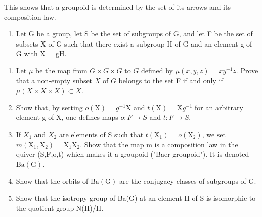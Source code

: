 This shows that a groupoid is determined by the set of its arrows and its composition law.

\begin{enumerate}
\def\labelenumi{\arabic{enumi})}
\setcounter{enumi}{11}
\tightlist
\item
  Let G be a group, let S be the set of subgroups of G, and let F be the set of subsets X of G such that there exist a subgroup H of G and an element g of G with X = gH.
\end{enumerate}

\begin{enumerate}
\def\labelenumi{\alph{enumi})}
\item
  Let \(\mu\) be the map from \(G \times G \times G\) to \(G\) defined by \(\mu(x,y,z)=xy^{-1}z\). Prove that a non-empty subset \(X\) of \(G\) belongs to the set F if and only if \(\mu(X\times X\times X)\subset X\).
\item
  Show that, by setting \(o(\mathrm{X}) = g^{-1}\mathrm{X}\) and \(t(\mathrm{X}) = \mathrm{X}g^{-1}\) for an arbitrary element g of X, one defines maps \(o: F \to S\) and \(t: F \to S\).
\item
  If \(X_{1}\) and \(X_{2}\) are elements of S such that \(t(\mathrm{X}_{1}) = o(\mathrm{X}_{2})\), we set \(m(\mathrm{X}_{1}, \mathrm{X}_{2}) = \mathrm{X}_{1}\mathrm{X}_{2}\). Show that the map m is a composition law in the quiver (S,F,o,t) which makes it a groupoid ("Baer groupoid"). It is denoted \(\mathrm{Ba}(\mathrm{G})\).
\item
  Show that the orbits of \(\mathrm{Ba}(\mathrm{G})\) are the conjugacy classes of subgroups of G.
\item
  Show that the isotropy group of Ba(G) at an element H of S is isomorphic to the quotient group N(H)/H.
\end{enumerate}

\setcounter{exercisegroup}{4}

